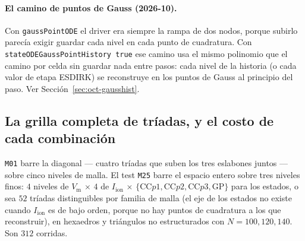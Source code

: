 \documentclass[11pt,a4paper]{article}
\newcommand{\code}[1]{\texttt{\small #1}}
\newcommand{\Vm}{V_{\text{m}}}
\newcommand{\Iion}{I_{\mathrm{ion}}}
\begin{document}
\paragraph{El camino de puntos de Gauss (2026-10).} Con \code{gaussPointODE} el driver era
siempre la rampa de dos nodos, porque subirlo parecía exigir guardar cada nivel en cada punto
de cuadratura. Con \code{stateODEGaussPointHistory true} ese camino usa el mismo polinomio que
el camino por celda sin guardar nada entre pasos: cada nivel de la historia (o cada valor de
etapa ESDIRK) se reconstruye en los puntos de Gauss al principio del paso. Ver
Sección~\ref{sec:oct-gausshist}.


\subsection{La grilla completa de tríadas, y el costo de cada combinación}
\label{sec:m25}

\code{M01} barre la diagonal --- cuatro tríadas que suben los tres eslabones
juntos --- sobre cinco niveles de malla. El test \code{M25} barre el espacio entero
sobre tres niveles finos: $4$ niveles de $\Vm$ $\times$ $4$ de $\Iion$ $\times$
$\{\mathrm{CC}p1,\mathrm{CC}p2,\mathrm{CC}p3,\mathrm{GP}\}$ para los estados, o sea
$52$ tríadas distinguibles por familia de malla (el eje de los estados no existe
cuando $\Iion$ es de bajo orden, porque no hay puntos de cuadratura a los que
reconstruir), en hexaedros y triángulos no estructurados con $N=100,120,140$. Son
$312$ corridas.
\end{document}
